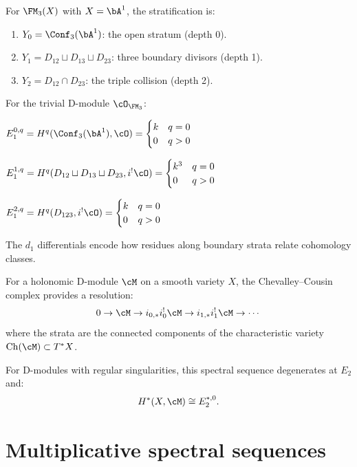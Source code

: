\begin{computation}
\label{comp:cc-fm3}
For $\FM_3(X)$ with $X = \bA^1$, the stratification is:
\begin{enumerate}[label=(\roman*)]
\item $Y_0 = \Conf_3(\bA^1)$: the open stratum (depth 0).
\item $Y_1 = D_{12} \sqcup D_{13} \sqcup D_{23}$: three boundary divisors (depth 1).
\item $Y_2 = D_{12} \cap D_{23}$: the triple collision (depth 2).
\end{enumerate}

For the trivial D-module $\cO_{\FM_3}$:

$E_1^{0,q} = H^q(\Conf_3(\bA^1), \cO) = \begin{cases} k & q = 0 \\ 0 & q > 0 \end{cases}$

$E_1^{1,q} = H^q(D_{12} \sqcup D_{13} \sqcup D_{23}, i^! \cO) = \begin{cases} k^3 & q = 0 \\ 0 & q > 0 \end{cases}$

$E_1^{2,q} = H^q(D_{123}, i^! \cO) = \begin{cases} k & q = 0 \\ 0 & q > 0 \end{cases}$

The $d_1$ differentials encode how residues along boundary strata relate cohomology
classes.
\end{computation}

\begin{theorem}
\label{thm:cousin-resolution}
For a holonomic D-module $\cM$ on a smooth variety $X$, the Chevalley--Cousin
complex provides a resolution:
\[
0 \to \cM \to i_{0,*} i_0^! \cM \to i_{1,*} i_1^! \cM \to \cdots
\]
where the strata are the connected components of the characteristic variety
$\mathrm{Ch}(\cM) \subset T^*X$.

For D-modules with regular singularities, this spectral sequence degenerates
at $E_2$ and:
\[
H^*(X, \cM) \cong E_2^{*,0}.
\]
\end{theorem}


\section{Multiplicative spectral sequences}
\label{sec:mult-ss}


